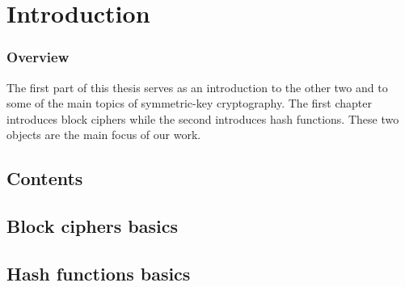 \part[Introduction]
	{Introduction}
\label{part:prolego}

\section*{Overview}

The first part of this thesis serves as an introduction to the other two and to some of the
main topics of symmetric-key cryptography. The first chapter introduces block ciphers
while the second introduces hash functions. These two objects are the main focus of our work.



\cleardoublepage
\chapter*{Contents}
\parttoc


\chapter[Introduction aux chiffres par bloc]{Block ciphers basics}
\label{cha:block_intro}



\chapter[Introduction aux fonctions de hachage]{Hash functions basics}
\label{chap:hashfun}

